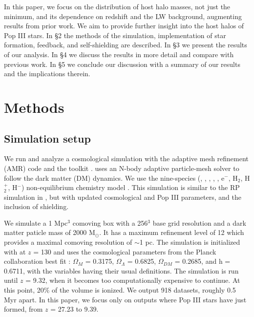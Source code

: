 \documentclass[a4paper,fleqn,usenatbib]{mnras}
\begin{document}
In this paper, we focus on the distribution of host halo masses, not just the minimum, and its dependence on redshift and the LW background, augmenting results from prior work. We aim to provide further insight into the host halos of Pop III stars. In \S 2 the methods of the simulation, implementation of star formation, feedback, and \hh{} self-shielding are described. In \S 3 we present the results of our analysis. In \S 4 we discuss the results in more detail and compare with previous work. In \S 5 we conclude our discussion with a summary of our results and the implications therein.

\section{Methods}
\subsection{Simulation setup}
We run and analyze a cosmological simulation with the adaptive mesh refinement (AMR) code \enzo{} \citep{Enzo} and the toolkit \yt{} \citep{yt_full_paper}. \enzo{} uses an N-body adaptive particle-mesh solver \citep{Efstathiou85, Couchman91, BryanNorman1997} to follow the dark matter (DM) dynamics. We use the nine-species (\hi, \hii, \hei, \heii, \heiii, e$^{-}$, H$_{2}$, H$_{2}^{+}$, H$^{-}$) non-equilibrium chemistry model \citep{Abel97, Anninos97}. This simulation is similar to the RP simulation in \citet[hereafter W12]{Wise12_RP}, but with updated cosmological and Pop III parameters, and the inclusion of \hh{} shielding.

We simulate a 1 Mpc$^{3}$ comoving box with a 256$^{3}$ base grid 
resolution and a dark matter paticle mass of 2000 M$_{\odot}$. It has a maximum refinement level of 12 which provides a maximal comoving resolution of $\sim$1 pc. The simulation is 
initialized with \music{} \citep{Hahn11_MUSIC} at $z$ = 130 and uses the cosmological parameters from the Planck collaboration best fit 
\citet{Planck13_Cosmo}: $\Omega_{M}$ = 0.3175, $\Omega_{\Lambda}$ = 
0.6825, $\Omega_{DM}$ = 0.2685, and h = 0.6711, with the variables 
having their usual definitions. The simulation is run until $z$ = 9.32, when it becomes too computationally expensive to continue. At this point, 20\% of the volume is ionized. We output 918 datasets,  roughly 0.5 Myr apart. In this paper, we focus only on outputs where Pop III stars have just formed, from $z$ = 27.23 to 9.39. 
\end{document}
